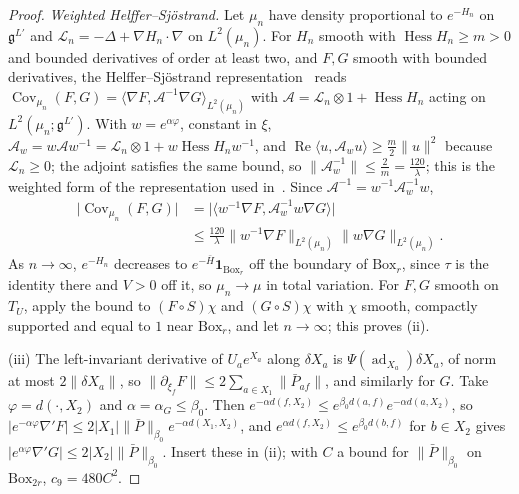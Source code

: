 \documentclass[11pt]{amsart}
\theoremstyle{definition}
\theoremstyle{remark}
\numberwithin{equation}{section}
\newcommand{\g}{\mathfrak{g}}
\begin{document}
\begin{proof}
\emph{Weighted Helffer--Sj\"ostrand.} Let $\mu_n$ have density proportional
to $e^{-H_n}$ on $\g^{L'}$ and $\mathcal L_n=-\Delta+\nabla H_n\cdot\nabla$
on $L^2(\mu_n)$. For $H_n$ smooth with $\operatorname{Hess}H_n\ge m>0$ and
bounded derivatives of order at least two, and $F,G$ smooth with bounded
derivatives, the Helffer--Sj\"ostrand representation~\cite{HS94,NS97} reads
$\operatorname{Cov}_{\mu_n}(F,G)=\langle\nabla F,\mathcal A^{-1}\nabla G
\rangle_{L^2(\mu_n)}$ with $\mathcal A=\mathcal L_n\otimes1+\operatorname{Hess}
H_n$ acting on $L^2(\mu_n;\g^{L'})$. With $w=e^{\alpha\varphi}$, constant in
$\xi$, $\mathcal A_w=w\mathcal Aw^{-1}=\mathcal L_n\otimes1+w\operatorname
{Hess}H_nw^{-1}$, and $\operatorname{Re}\langle u,\mathcal A_wu\rangle\ge
\frac m2\lVert u\rVert^2$ because $\mathcal L_n\ge0$; the adjoint satisfies
the same bound, so $\lVert\mathcal A_w^{-1}\rVert\le\frac2m=\frac{120}
\lambda$; this is the weighted form of the representation used
in~\cite{BJS00,Hel98}. Since $\mathcal A^{-1}=w^{-1}\mathcal A_w^{-1}w$,
\[
\begin{split}
\lvert\operatorname{Cov}_{\mu_n}(F,G)\rvert&=\bigl\lvert\langle w^{-1}\nabla
F,\mathcal A_w^{-1}w\nabla G\rangle\bigr\rvert\\
&\le\frac{120}\lambda\lVert w^{-1}\nabla F\rVert_{L^2(\mu_n)}\lVert w\nabla
G\rVert_{L^2(\mu_n)}.
\end{split}
\]
As $n\to\infty$, $e^{-H_n}$ decreases to $e^{-\bar H}\mathbf 1_{\mathrm{Box}
_r}$ off the boundary of $\mathrm{Box}_r$, since $\tau$ is the identity
there and $V>0$ off it, so $\mu_n\to\mu$ in total variation. For $F,G$
smooth on $T_U$, apply the bound to $(F\circ S)\chi$ and $(G\circ S)\chi$
with $\chi$ smooth, compactly supported and equal to $1$ near $\mathrm{Box}
_r$, and let $n\to\infty$; this proves (ii).

(iii) The left-invariant derivative of $U_ae^{X_a}$ along $\delta X_a$ is
$\Psi(\operatorname{ad}_{X_a})\delta X_a$, of norm at most $2\lVert\delta
X_a\rVert$, so $\lVert\partial_{\xi_f}F\rVert\le2\sum_{a\in X_1}\lVert\bar
P_{af}\rVert$, and similarly for $G$. Take $\varphi=d(\cdot,X_2)$ and $\alpha
=\alpha_G\le\beta_0$. Then $e^{-\alpha d(f,X_2)}\le e^{\beta_0d(a,f)}e^{-
\alpha d(a,X_2)}$, so $\lvert e^{-\alpha\varphi}\nabla'F\rvert\le2\lvert
X_1\rvert\lVert\bar P\rVert_{\beta_0}e^{-\alpha d(X_1,X_2)}$, and $e^{\alpha
d(f,X_2)}\le e^{\beta_0d(b,f)}$ for $b\in X_2$ gives $\lvert e^{\alpha
\varphi}\nabla'G\rvert\le2\lvert X_2\rvert\lVert\bar P\rVert_{\beta_0}$.
Insert these in (ii); with $C$ a bound for $\lVert\bar P\rVert_{\beta_0}$
on $\mathrm{Box}_{2r}$, $c_9=480C^2$.
\end{proof}
\end{document}
